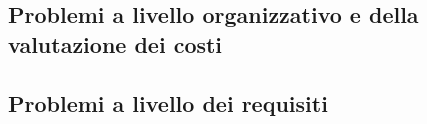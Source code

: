 	\subsection{Problemi a livello organizzativo e della valutazione dei costi}
	\subsection{Problemi a livello dei requisiti}